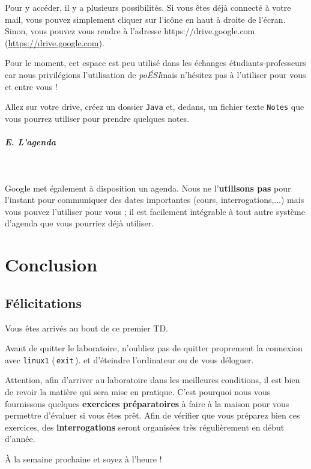\documentclass[a4paper,11pt]{article}
\begin{document}
 \par 
 Pour y acc\'eder, il y a plusieurs possibilit\'es. Si vous \^etes d\'ej\`a connect\'e \`a votre mail, vous pouvez simplement cliquer sur l'ic\^one en haut \`a droite de l'\'ecran. Sinon, vous pouvez vous rendre \`a l'adresse https://drive.google.com (\url{https://drive.google.com}).
			
 \par
Pour le moment, cet espace est peu utilis\'e dans les \'echanges \'etudiants-professeurs car nous privil\'egions l'utilisation de \textit{po\'ESI}mais n'h\'esitez pas \`a l'utiliser pour vous et entre vous !
			
\par
\begin{Exercice}{}
Allez sur votre drive, cr\'eez un dossier \verb_Java_ et, dedans, un fichier texte \verb_Notes_ que vous pourrez utiliser pour prendre quelques notes.
\end{Exercice}

 \par
        
\subparagraph{E. L'agenda} 
		
\textcolor{white}{.} \par
Google met \'egalement \`a disposition un agenda. Nous ne l'\textbf{utilisons pas} pour l'instant pour communiquer des dates importantes (cours, interrogations,...) mais vous pouvez l'utiliser pour vous ; il est facilement int\'egrable \`a tout autre syst\`eme d'agenda que vous pourriez d\'ej\`a utiliser.
			
\par

\section{Conclusion}
\subsection{Félicitations}
Vous \^etes arriv\'es au bout de ce premier TD.
 \par
Avant de quitter le laboratoire, n'oubliez pas de quitter proprement la connexion avec \verb_linux1_ (\,\verb|exit|\,). et d'\'eteindre l'ordinateur ou de vous d\'eloguer.
\par
Attention, afin d'arriver au laboratoire dans les meilleures conditions, il est bien de revoir la mati\`ere qui sera mise en pratique.  C'est pourquoi nous vous fournissons quelques \textbf{exercices pr\'eparatoires} \`a faire \`a la maison pour vous permettre d'\'evaluer si vous \^etes pr\^et.  Afin de v\'erifier que vous pr\'eparez bien ces exercices, des \textbf{interrogations} seront organis\'ees tr\`es r\'eguli\`erement en d\'ebut d'ann\'ee. 
 \par
\`A la semaine prochaine et soyez \`a l'heure !
\par
	
	
\end{document}
